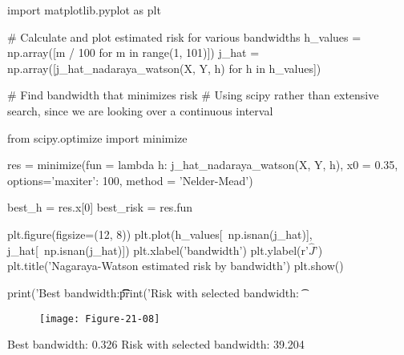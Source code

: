 \begin{python}
import matplotlib.pyplot as plt

# Calculate and plot estimated risk for various bandwidths
h_values = np.array([m / 100 for m in range(1, 101)])
j_hat = np.array([j_hat_{n}adaraya_watson(X, Y, h) for h in h_values])
\end{python}

\begin{python}
# Find bandwidth that minimizes risk
# Using scipy rather than extensive search, since we are looking over a continuous interval

from scipy.optimize import minimize

res = minimize(fun = lambda h: j_hat_{n}adaraya_watson(X, Y, h), x0 = 0.35, options={'maxiter': 100}, method = 'Nelder-Mead')

best_h = res.x[0]
best_risk = res.fun
\end{python}

\begin{python}
plt.figure(figsize=(12, 8))
plt.plot(h_values[~np.isnan(j_hat)], j_hat[~np.isnan(j_hat)])
plt.xlabel('bandwidth')
plt.ylabel(r'$\hat{J}$')
plt.title('Nagaraya-Watson estimated risk by bandwidth')
plt.show()

print('Best bandwidth:\t\t\t%
print('Risk with selected bandwidth: \t%
\end{python}

\begin{figure}[H]
\centering
\texttt{[image: Figure-21-08]}
\end{figure}

\begin{console}
Best bandwidth:                 0.326
Risk with selected bandwidth:   39.204
\end{console}


